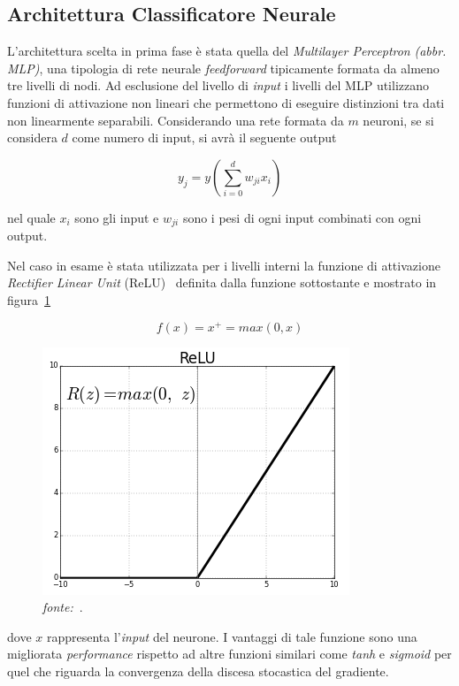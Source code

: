 \subsection{Architettura Classificatore Neurale}
\label{classificatorenninterno}
L'architettura scelta in prima fase è stata quella del \textit{Multilayer Perceptron} \textit{(abbr. MLP)}, una tipologia di rete neurale \textit{feedforward} tipicamente formata da almeno tre livelli di nodi. Ad esclusione del livello di \textit{input} i livelli del MLP utilizzano  funzioni di attivazione non lineari che permettono di eseguire distinzioni tra dati non linearmente separabili. Considerando una rete formata da $m$ neuroni,  se si considera $d$ come numero di input, si avrà il seguente output

\[y_j=y\left( \sum_{i=0}^d w_{ji}x_i \right)\]


nel quale $x_i$ sono gli input e $w_{ji}$ sono i pesi di ogni input combinati con ogni output. 

Nel caso in esame è stata utilizzata per i livelli interni la funzione di attivazione \textit{Rectifier Linear Unit} (ReLU)~\cite{relu} definita dalla funzione sottostante e mostrato in figura~\ref{fig:relu}

\[f(x) = x^+ = max(0,x)\]

\begin{figure}[htb]
    \centering
    \includegraphics[width=0.7\columnwidth]{figures/relu.png}
    \caption{\textit{fonte:}~\cite{relufig}.\label{fig:relu}}
\end{figure}

dove $x$ rappresenta l'\textit{input} del neurone. 
I vantaggi di tale funzione sono una migliorata \textit{performance} rispetto ad altre funzioni similari come \textit{tanh} e \textit{sigmoid} per quel che riguarda la convergenza della discesa stocastica del gradiente. 

